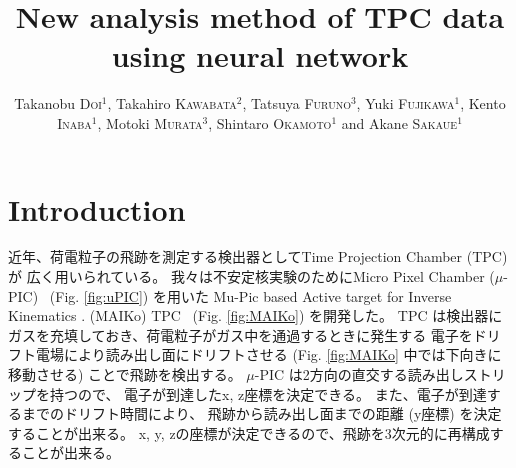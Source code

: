 \documentclass{jps-cp}
\title{New analysis method of TPC data using neural network}
\author{
  Takanobu \textsc{Doi}$^{1}$, Takahiro \textsc{Kawabata}$^{2}$, Tatsuya \textsc{Furuno}$^{3}$,
  Yuki \textsc{Fujikawa}$^{1}$, Kento \textsc{Inaba}$^{1}$, Motoki \textsc{Murata}$^{3}$,
  Shintaro \textsc{Okamoto}$^{1}$ and Akane \textsc{Sakaue}$^{1}$}
\begin{document}
\maketitle

\section{Introduction}
近年、荷電粒子の飛跡を測定する検出器としてTime Projection Chamber (TPC) が
広く用いられている。
我々は不安定核実験のためにMicro Pixel Chamber ($\mu$-PIC)~\cite{mupic} (Fig. \ref{fig:uPIC}) 
を用いた
Mu-Pic based Active target for Inverse Kinematics . (MAIKo) TPC~\cite{MAIKo} (Fig. \ref{fig:MAIKo}) を開発した。
TPC は検出器にガスを充填しておき、荷電粒子がガス中を通過するときに発生する
電子をドリフト電場により読み出し面にドリフトさせる
(Fig. \ref{fig:MAIKo} 中では下向きに移動させる) ことで飛跡を検出する。
$\mu$-PIC は2方向の直交する読み出しストリップを持つので、
電子が到達したx, z座標を決定できる。
また、電子が到達するまでのドリフト時間により、
飛跡から読み出し面までの距離 (y座標) を決定することが出来る。
x, y, zの座標が決定できるので、飛跡を3次元的に再構成することが出来る。
\end{document}
